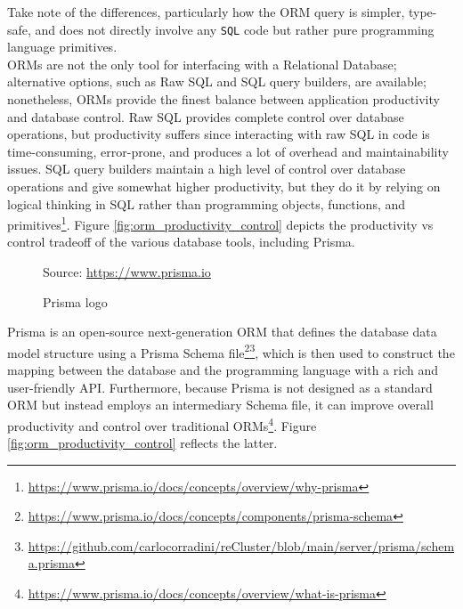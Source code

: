 Take note of the differences, particularly how the ORM query is simpler, type-safe,
and does not directly involve any \texttt{SQL} code but rather pure programming language
primitives. \\ %
ORMs are not the only tool for interfacing with a Relational Database;
alternative options, such as Raw SQL and SQL query builders, are available; nonetheless,
ORMs provide the finest balance between application productivity and database
control. Raw SQL provides complete control over database operations, but
productivity suffers since interacting with raw SQL in code is time-consuming, error-prone,
and produces a lot of overhead and maintainability issues. SQL query builders maintain
a high level of control over database operations and give somewhat higher productivity,
but they do it by relying on logical thinking in SQL rather than programming
objects, functions, and primitives\footnote{\url{https://www.prisma.io/docs/concepts/overview/why-prisma}}.
Figure \ref{fig:orm_productivity_control} depicts the productivity vs control tradeoff
of the various database tools, including Prisma.

\begin{figure} %
  \centering
  \def\stackalignment{l} %
  {\scriptsize \parbox[t]{\linewidth}{ Source: \url{https://www.prisma.io}} }
  \caption{Prisma logo}
\end{figure}

Prisma is an open-source next-generation ORM that defines the database data model
structure using a Prisma Schema file\footnote{\url{https://www.prisma.io/docs/concepts/components/prisma-schema}}\footnote{\url{https://github.com/carlocorradini/reCluster/blob/main/server/prisma/schema.prisma}},
which is then used to construct the mapping between the database and the
programming language with a rich and user-friendly API. Furthermore, because
Prisma is not designed as a standard ORM but instead employs an intermediary
Schema file, it can improve overall productivity and control over traditional ORMs\footnote{\url{https://www.prisma.io/docs/concepts/overview/what-is-prisma}}.
Figure \ref{fig:orm_productivity_control} reflects the latter.

